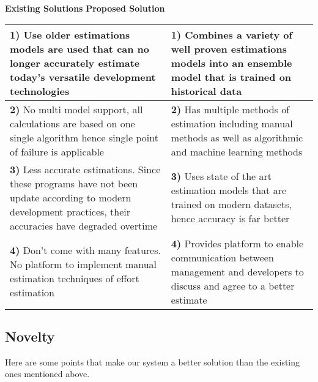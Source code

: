 \begin{center}

	\large{\textbf{Existing Solutions}} \hspace{30mm} \large{\textbf{Proposed Solution}}
	\vspace{5mm}
	\large

	\begin{tabularx}{\textwidth}{|X|X|}

		\hline
		{\textbf{1)} Use older estimations models are used that can no longer accurately estimate today's versatile development technologies} & {\textbf{1)} Combines a variety of well proven estimations models into an ensemble model that is trained on historical data} \\
		\hline
		{\textbf{2)} No multi model support, all calculations are based on one single algorithm hence single point of failure is applicable} & {\textbf{2)} Has multiple methods of estimation including manual methods as well as algorithmic and machine learning methods} \\
		\hline
		{\textbf{3)} Less accurate estimations. Since these programs have not been update according to modern development practices, their accuracies have degraded overtime} & {\textbf{3)} Uses state of the art estimation models that are trained on modern datasets, hence accuracy is far better} \\
		\hline
		{\textbf{4)} Don't come with many features. No platform to implement manual estimation techniques of effort estimation } & {\textbf{4)} Provides platform to enable communication between management and developers to discuss and agree to a better estimate} \\
		\hline
		

	\end{tabularx}
\end{center}





\subsection{Novelty}
Here are some points that make our system a better solution than the existing ones mentioned above.

